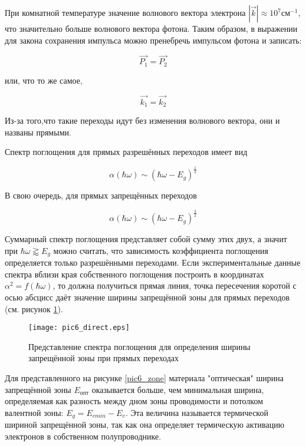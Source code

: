 При комнатной температуре значение волнового вектора электрона $|\overrightarrow{k}| \approx 10^{7} \text{см}^{-1}$, что значительно больше волнового вектора фотона. Таким образом, в выражении для закона сохранения импульса можно пренебречь импульсом фотона и записать:

\begin{equation}
\overrightarrow{P_{1}} = \overrightarrow{P_{2}}
\end{equation}

или, что то же самое,

\begin{equation}
\overrightarrow{k_{1}} = \overrightarrow{k_{2}}
\end{equation}

Из-за того,что такие переходы идут без изменения волнового вектора, они и названы прямыми.

Спектр поглощения для прямых разрешённых переходов имеет вид

\begin{equation}
\alpha(\hbar \omega) \sim (\hbar \omega - E_{g})^{\frac{1}{2}}
\end{equation}

В свою очередь, для прямых запрещённых переходов

\begin{equation}
\alpha(\hbar \omega) \sim (\hbar \omega - E_{g})^{\frac{3}{2}}
\end{equation}

Суммарный спектр поглощения представляет собой сумму этих двух, а значит при $\hbar \omega \gtrapprox E_{g}$ можно считать, что зависимость коэффициента поглощения определяется только разрешёнными переходами. Если экспериментальные данные спектра вблизи края собственного поглощения построить в координатах $\alpha^2 = f(\hbar \omega)$, то должна получиться прямая линия, точка пересечения коротой с осью абсцисс даёт значение ширины запрещённой зоны для прямых переходов (см. рисунок \ref{pic6_direct}).

\begin{figure}[h!]\centering
\texttt{[image: pic6\_direct.eps]}
\caption{Представление спектра поглощения для определения ширины запрещённой зоны при прямых переходах}
\label{pic6_direct}
\end{figure}

Для представленного на рисунке \ref{pic6_zone} материала "оптическая" ширина запрещённой зоны $E_{\text{опт}}$ оказывается больше, чем минимальная ширина, определяемая как разность между дном зоны проводимости и потолком валентной зоны: $E_{g} = E_{c min} - E_{v}$. Эта величина называется термической шириной запрещённой зоны, так как она определяет термическую активацию электронов в собственном полупроводнике.

